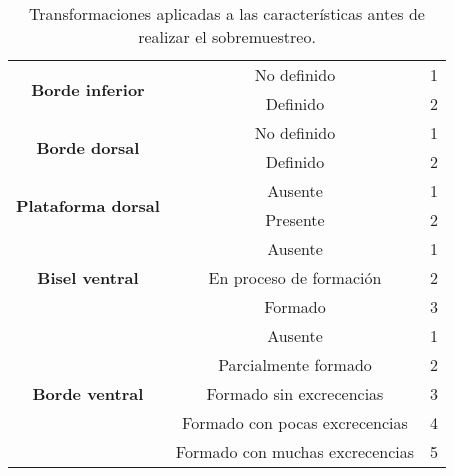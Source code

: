 \begin{table}[H]
{\begin{tabular}{|c|c|c|}
\multirow{2}{*}{\textbf{Borde inferior}}              & No definido                     & 1                                \\ \cline{2-3}
                                                      & Definido                        & 2                                \\ \hline
\multirow{2}{*}{\textbf{Borde dorsal}}                & No definido                     & 1                                \\ \cline{2-3}
                                                      & Definido                        & 2                                \\ \hline
\multirow{2}{*}{\textbf{Plataforma dorsal}}           & Ausente                         & 1                                \\ \cline{2-3}
                                                      & Presente                        & 2                                \\ \hline
\multirow{3}{*}{\textbf{Bisel ventral}}               & Ausente                         & 1                                \\ \cline{2-3}
                                                      & En proceso de formación         & 2                                \\ \cline{2-3}
                                                      & Formado                         & 3                                \\ \hline
\multirow{5}{*}{\textbf{Borde ventral}}               & Ausente                         & 1                                \\ \cline{2-3}
                                                      & Parcialmente formado            & 2                                \\ \cline{2-3}
                                                      & Formado sin excrecencias        & 3                                \\ \cline{2-3}
                                                      & Formado con pocas excrecencias  & 4                                \\ \cline{2-3}
                                                      & Formado con muchas excrecencias & 5                                \\ \hline
\end{tabular}%
}
\caption{Transformaciones aplicadas a las características antes de realizar el sobremuestreo.}\label{table:transformaciones_numericas}

\end{table}

